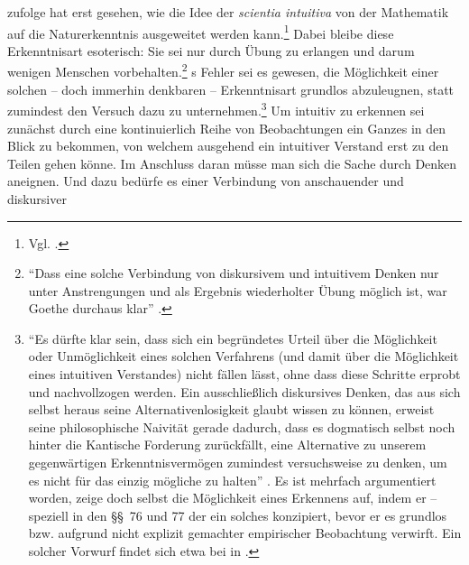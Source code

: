  zufolge hat erst  gesehen, wie die Idee der \emph{scientia intuitiva} von
der Mathematik auf die Naturerkenntnis ausgeweitet werden kann.\footnote{Vgl.
\cite[][188]{Foerster:DieBedeutungvonSS7677deremphKritikderUrteilskraftfuerdieEntwicklungdernachkantischenPhilosophieTeil12002}.}
Dabei bleibe diese Erkenntnisart esoterisch: Sie sei nur durch Übung zu erlangen
und darum wenigen Menschen vorbehalten.\footnote{\enquote{Dass eine solche
Verbindung von diskursivem und intuitivem Denken nur unter Anstrengungen und als
Ergebnis wiederholter Übung möglich ist, war Goethe durchaus klar}
\parencite[][185]{Foerster:DieBedeutungvonSS7677deremphKritikderUrteilskraftfuerdieEntwicklungdernachkantischenPhilosophieTeil12002}.}
s Fehler sei es gewesen, die Möglichkeit einer solchen --
doch immerhin denkbaren -- Erkenntnisart grundlos abzuleugnen, statt zumindest
den Versuch dazu zu unternehmen.\footnote{\enquote{Es dürfte klar sein, dass sich ein begründetes Urteil über die Möglichkeit oder
Unmöglichkeit eines solchen Verfahrens (und damit über die Möglichkeit eines
intuitiven Verstandes) nicht fällen lässt, ohne dass diese Schritte erprobt und
nachvollzogen werden. Ein ausschließlich diskursives Denken, das aus sich selbst
heraus seine Alternativenlosigkeit glaubt wissen zu können, erweist seine
philosophische Naivität gerade dadurch, dass es dogmatisch selbst noch hinter
die Kantische Forderung zurückfällt, eine Alternative zu unserem gegenwärtigen
Erkenntnisvermögen zumindest versuchsweise zu denken, um es nicht für das einzig
mögliche zu halten}
\parencite[][187]{Foerster:DieBedeutungvonSS7677deremphKritikderUrteilskraftfuerdieEntwicklungdernachkantischenPhilosophieTeil12002}.
Es ist mehrfach argumentiert worden,  zeige doch selbst
die Möglichkeit eines  Erkennens auf, indem er -- speziell
in den \S\S~76 und 77 der  ein solches
konzipiert, bevor er es grundlos bzw. aufgrund nicht explizit gemachter
empirischer Beobachtung verwirft. Ein solcher Vorwurf findet sich etwa bei
 in 
\parencite[vgl.][IV: 335,9..11, 338.35--343.17]{Hegel:GesammelteWerke}.}
Um intuitiv zu erkennen sei zunächst durch eine kontinuierlich Reihe von
Beobachtungen ein Ganzes in den Blick zu bekommen, von welchem ausgehend ein intuitiver Verstand erst zu
den Teilen gehen könne. Im Anschluss daran müsse man sich die Sache durch Denken
aneignen. Und dazu bedürfe es einer Verbindung von anschauender und diskursiver
